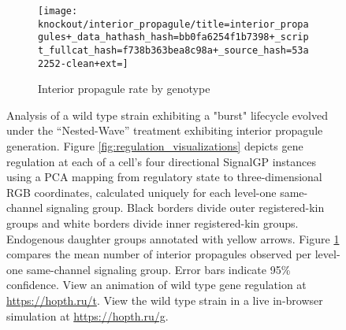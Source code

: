 \begin{figure}[!htbp]
\begin{center}
\begin{minipage}[t]{\linewidth}
\centering
\vspace{0pt} %
\begin{subfigure}[b]{\linewidth}
\texttt{[image: knockout/interior\_propagule/title=interior\_propagules+\_data\_hathash\_hash=bb0fa6254f1b7398+\_script\_fullcat\_hash=f738b363bea8c98a+\_source\_hash=53a2252-clean+ext=]}%
\caption{Interior propagule rate by genotype}
\label{fig:interior_propagule_rate}
\end{subfigure}
\end{minipage}%
\hspace*{\fill}


\caption{
Analysis of a wild type strain exhibiting a "burst" lifecycle evolved under the ``Nested-Wave'' treatment exhibiting interior propagule generation.
Figure \ref{fig:regulation_visualizations} depicts gene regulation at each of a cell's four directional SignalGP instances using a PCA mapping from regulatory state to three-dimensional RGB coordinates, calculated uniquely for each level-one same-channel signaling group.
Black borders divide outer registered-kin groups and white borders divide inner registered-kin groups.
Endogenous daughter groups annotated with yellow arrows.
Figure \ref{fig:interior_propagule_rate} compares the mean number of interior propagules observed per level-one same-channel signaling group.
Error bars indicate 95\% confidence.
View an animation of wild type gene regulation at \url{https://hopth.ru/t}.
View the wild type strain in a live in-browser simulation at \url{https://hopth.ru/g}.
}
\label{fig:ko-interior_propagule}
\end{center}
\end{figure}
